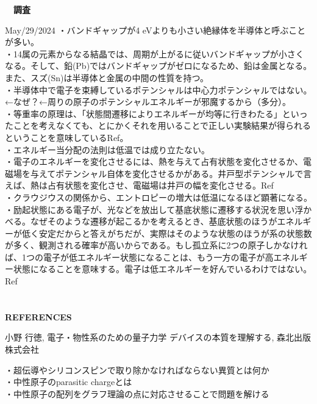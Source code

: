 \documentclass[a4paper,10.5pt]{ltjsarticle}
\begin{document}
\centerline
{\huge \bfseries　調査}
\rightline
{May/29/2024}
\leftline
{}
・バンドギャップが4 eVよりも小さい絶縁体を半導体と呼ぶことが多い。\\
・14属の元素からなる結晶では、周期が上がるに従いバンドギャップが小さくなる。そして、鉛(Pb)ではバンドギャップがゼロになるため、鉛は金属となる。また、スズ(Sn)は半導体と金属の中間の性質を持つ。\\
・半導体中で電子を束縛しているポテンシャルは中心力ポテンシャルではない。←なぜ？←周りの原子のポテンシャルエネルギーが邪魔するから（多分）。\\
・等重率の原理は、「状態間遷移によりエネルギーが均等に行きわたる」といったことを考えなくても、とにかくそれを用いることで正しい実験結果が得られるということを意味しているRef\cite{1}。\\
・エネルギー当分配の法則は低温では成り立たない。\\
・電子のエネルギーを変化させるには、熱を与えて占有状態を変化させるか、電磁場を与えてポテンシャル自体を変化させるかがある。井戸型ポテンシャルで言えば、熱は占有状態を変化させ、電磁場は井戸の幅を変化させる。Ref\cite{1}\\
・クラウジウスの関係から、エントロピーの増大は低温になるほど顕著になる。\\
・励起状態にある電子が、光などを放出して基底状態に遷移する状況を思い浮かべる。なぜそのような遷移が起こるかを考えるとき、基底状態のほうがエネルギーが低く安定だからと答えがちだが、実際はそのような状態のほうが系の状態数が多く、観測される確率が高いからである。もし孤立系に2つの原子しかなければ、1つの電子が低エネルギー状態になることは、もう一方の電子が高エネルギー状態になることを意味する。電子は低エネルギーを好んでいるわけではない。Ref\cite{1}\\
\\
\\
{\Large \bfseries REFERENCES}
\begin{thebibliography}{1}
\vspace{-1.5cm}
   小野 行徳, 電子・物性系のための量子力学 デバイスの本質を理解する, 森北出版株式会社

\end{thebibliography}
\vspace{50pt}
・超伝導やシリコンスピンで取り除かなければならない異質とは何か\\
・中性原子のparasitic chargeとは\\
・中性原子の配列をグラフ理論の点に対応させることで問題を解ける\\
\end{document}
